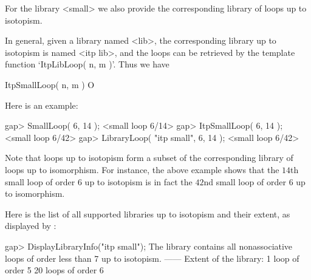 
For the library <small> we also provide the corresponding library of loops up
to isotopism.

In general, given a library named <lib>, the corresponding library up to
isotopism is named <itp lib>, and the loops can be retrieved by the template
function `ItpLibLoop( n, m )'. Thus we have

\>ItpSmallLoop( n, m ) O

Here is an example:

\beginexample
gap> SmallLoop( 6, 14 );
<small loop 6/14>
gap> ItpSmallLoop( 6, 14 );
<small loop 6/42>
gap> LibraryLoop( "itp small", 6, 14 );
<small loop 6/42>
\endexample

Note that loops up to isotopism form a subset of the corresponding library of
loops up to isomorphism. For instance, the above example shows that the $14$th
small loop of order $6$ up to isotopism is in fact the $42$nd small loop of
order $6$ up to isomorphism.

Here is the list of all supported libraries up to isotopism and their extent,
as displayed by \LOOPS:

\beginexample
gap> DisplayLibraryInfo("itp small");
The library contains all nonassociative loops of order less than 7 up to
isotopism.
------
Extent of the library:
   1 loop of order 5
   20 loops of order 6
\endexample
